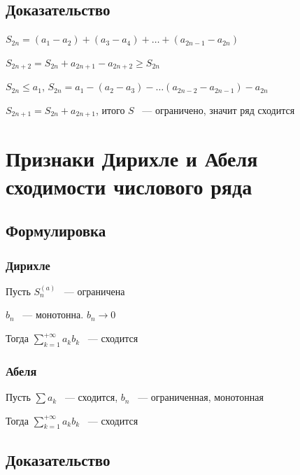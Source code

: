 \documentclass{article}
\begin{document}
        \subsection{Доказательство}
        
            $S_{2n} = (a_1 - a_2) + (a_3 - a_4) + \ldots + (a_{2n - 1} - a_{2n})$
            
            $S_{2n + 2} = S_{2n} + a_{2n + 1} - a_{2n + 2} \geq S_{2n}$
            
            $S_{2n} \leq a_1$, $S_{2n} = a_1 - (a_2 - a_3) - \ldots (a_{2n - 2} - a_{2n - 1}) - a_{2n}$
            
            $S_{2n + 1} = S_{2n} + a_{2n + 1}$, итого $S$ ~--- ограничено, значит ряд сходится
            
    \newpage
    
    \section{Признаки Дирихле и Абеля сходимости числового ряда}
    
        \subsection{Формулировка}
        
            \subsubsection{Дирихле}
            
                Пусть $S^{(a)}_n$ ~--- ограничена
                
                $b_n$ ~--- монотонна. $b_n \rightarrow 0$
                
                Тогда $\sum\limits^{+\infty}_{k = 1} a_k b_k$ ~--- сходится
                
            \subsubsection{Абеля}
            
                Пусть $\sum a_k$ ~--- сходится, $b_n$ ~--- ограниченная, монотонная
                
                Тогда $\sum\limits^{+\infty}_{k = 1} a_k b_k$ ~--- сходится 
                
        \subsection{Доказательство}
        
\end{document}
